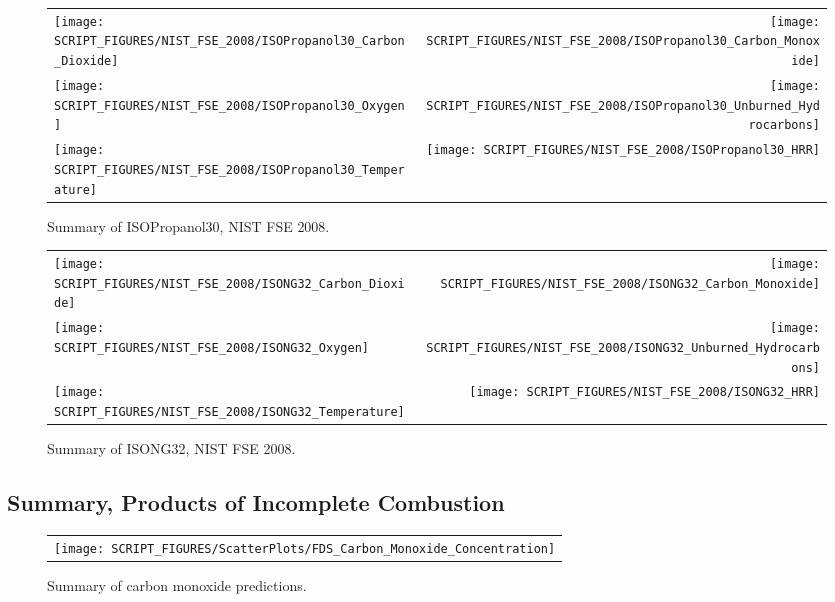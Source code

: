 \begin{figure}[h]
\begin{tabular*}{\textwidth}{l@{\extracolsep{\fill}}r}
\texttt{[image: SCRIPT\_FIGURES/NIST\_FSE\_2008/ISOPropanol30\_Carbon\_Dioxide]} &
\texttt{[image: SCRIPT\_FIGURES/NIST\_FSE\_2008/ISOPropanol30\_Carbon\_Monoxide]} \\
\texttt{[image: SCRIPT\_FIGURES/NIST\_FSE\_2008/ISOPropanol30\_Oxygen]} &
\texttt{[image: SCRIPT\_FIGURES/NIST\_FSE\_2008/ISOPropanol30\_Unburned\_Hydrocarbons]} \\
\texttt{[image: SCRIPT\_FIGURES/NIST\_FSE\_2008/ISOPropanol30\_Temperature]} &
\texttt{[image: SCRIPT\_FIGURES/NIST\_FSE\_2008/ISOPropanol30\_HRR]}
\end{tabular*}
\caption[Summary of ISOPropanol30, NIST FSE 2008]{Summary of ISOPropanol30, NIST FSE 2008.}
\label{NIST_FSE_1994_ISOPropanol30}
\end{figure}

\begin{figure}[h]
\begin{tabular*}{\textwidth}{l@{\extracolsep{\fill}}r}
\texttt{[image: SCRIPT\_FIGURES/NIST\_FSE\_2008/ISONG32\_Carbon\_Dioxide]} &
\texttt{[image: SCRIPT\_FIGURES/NIST\_FSE\_2008/ISONG32\_Carbon\_Monoxide]} \\
\texttt{[image: SCRIPT\_FIGURES/NIST\_FSE\_2008/ISONG32\_Oxygen]} &
\texttt{[image: SCRIPT\_FIGURES/NIST\_FSE\_2008/ISONG32\_Unburned\_Hydrocarbons]} \\
\texttt{[image: SCRIPT\_FIGURES/NIST\_FSE\_2008/ISONG32\_Temperature]} &
\texttt{[image: SCRIPT\_FIGURES/NIST\_FSE\_2008/ISONG32\_HRR]}
\end{tabular*}
\caption[Summary of ISONG32, NIST FSE 2008]{Summary of ISONG32, NIST FSE 2008.}
\label{NIST_FSE_1994_ISONG32}
\end{figure}

\clearpage

\subsection{Summary, Products of Incomplete Combustion}
\label{Carbon Monoxide Concentration}

\begin{figure}[h]
\begin{center}
\begin{tabular}{c}
\texttt{[image: SCRIPT\_FIGURES/ScatterPlots/FDS\_Carbon\_Monoxide\_Concentration]}
\end{tabular}
\end{center}
\caption[Summary of carbon monoxide predictions]{Summary of carbon monoxide predictions.}
\label{Summary_CO_Concentration}
\end{figure}

